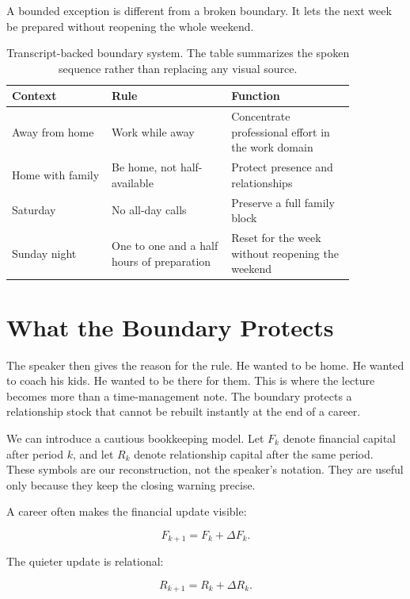 A bounded exception is different from a broken boundary. It lets the next week be prepared without reopening the whole weekend.

\begin{table}
\centering
\begin{tabular}{|p{0.25\linewidth}|p{0.30\linewidth}|p{0.31\linewidth}|}
\hline
\textbf{Context} & \textbf{Rule} & \textbf{Function} \\
\hline
Away from home & Work while away & Concentrate professional effort in the work domain \\
\hline
Home with family & Be home, not half-available & Protect presence and relationships \\
\hline
Saturday & No all-day calls & Preserve a full family block \\
\hline
Sunday night & One to one and a half hours of preparation & Reset for the week without reopening the weekend \\
\hline
\end{tabular}
\caption{Transcript-backed boundary system. The table summarizes the spoken sequence rather than replacing any visual source.}
\end{table}

\section{What the Boundary Protects}

The speaker then gives the reason for the rule. He wanted to be home. He wanted to coach his kids. He wanted to be there for them. This is where the lecture becomes more than a time-management note. The boundary protects a relationship stock that cannot be rebuilt instantly at the end of a career.

We can introduce a cautious bookkeeping model. Let \(F_k\) denote financial capital after period \(k\), and let \(R_k\) denote relationship capital after the same period. These symbols are our reconstruction, not the speaker's notation. They are useful only because they keep the closing warning precise.

A career often makes the financial update visible:

\begin{equation}
F_{k+1}=F_k+\Delta F_k.
\end{equation}

The quieter update is relational:

\begin{equation}
R_{k+1}=R_k+\Delta R_k.
\end{equation}

